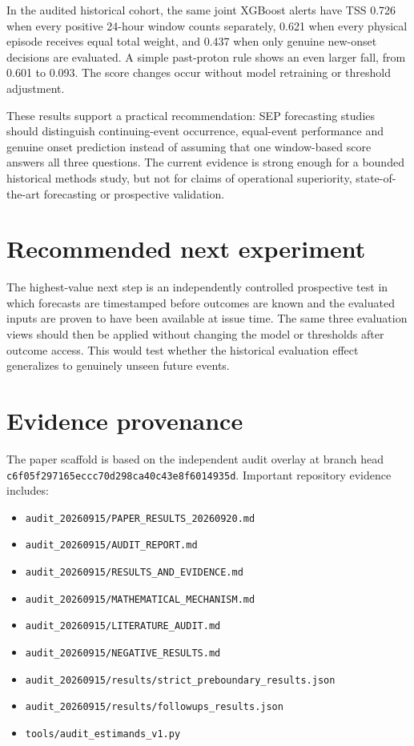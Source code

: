 \documentclass[11pt]{article}
\begin{document}
In the audited historical cohort, the same joint XGBoost alerts have TSS 0.726 when every positive 24-hour window counts separately, 0.621 when every physical episode receives equal total weight, and 0.437 when only genuine new-onset decisions are evaluated. A simple past-proton rule shows an even larger fall, from 0.601 to 0.093. The score changes occur without model retraining or threshold adjustment.

These results support a practical recommendation: SEP forecasting studies should distinguish continuing-event occurrence, equal-event performance and genuine onset prediction instead of assuming that one window-based score answers all three questions. The current evidence is strong enough for a bounded historical methods study, but not for claims of operational superiority, state-of-the-art forecasting or prospective validation.

\section*{Recommended next experiment}

The highest-value next step is an independently controlled prospective test in which forecasts are timestamped before outcomes are known and the evaluated inputs are proven to have been available at issue time. The same three evaluation views should then be applied without changing the model or thresholds after outcome access. This would test whether the historical evaluation effect generalizes to genuinely unseen future events.

\appendix

\section{Evidence provenance}

The paper scaffold is based on the independent audit overlay at branch head \texttt{c6f05f297165eccc70d298ca40c43e8f6014935d}. Important repository evidence includes:

\begin{itemize}
    \item \texttt{audit\_20260915/PAPER\_RESULTS\_20260920.md}
    \item \texttt{audit\_20260915/AUDIT\_REPORT.md}
    \item \texttt{audit\_20260915/RESULTS\_AND\_EVIDENCE.md}
    \item \texttt{audit\_20260915/MATHEMATICAL\_MECHANISM.md}
    \item \texttt{audit\_20260915/LITERATURE\_AUDIT.md}
    \item \texttt{audit\_20260915/NEGATIVE\_RESULTS.md}
    \item \texttt{audit\_20260915/results/strict\_preboundary\_results.json}
    \item \texttt{audit\_20260915/results/followups\_results.json}
    \item \texttt{tools/audit\_estimands\_v1.py}
\end{itemize}
\end{document}
